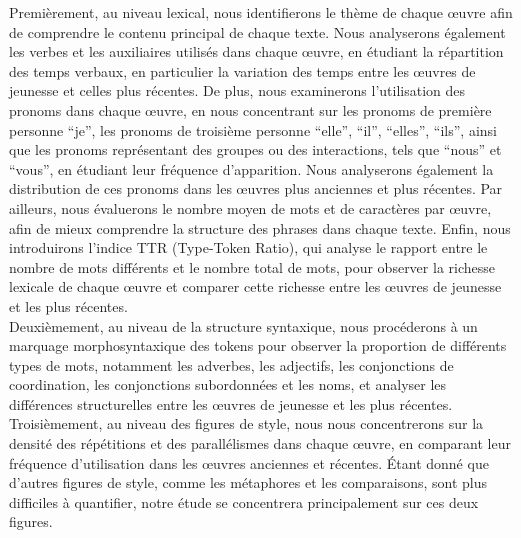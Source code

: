 Premièrement, au niveau lexical, nous identifierons le thème de chaque œuvre afin de comprendre le contenu principal de chaque texte. Nous analyserons également les verbes et les auxiliaires utilisés dans chaque œuvre, en étudiant la répartition des temps verbaux, en particulier la variation des temps entre les œuvres de jeunesse et celles plus récentes. De plus, nous examinerons l'utilisation des pronoms dans chaque œuvre, en nous concentrant sur les pronoms de première personne ``je'', les pronoms de troisième personne ``elle'', ``il'', ``elles'', ``ils'', ainsi que les pronoms représentant des groupes ou des interactions, tels que ``nous'' et ``vous'', en étudiant leur fréquence d'apparition. Nous analyserons également la distribution de ces pronoms dans les œuvres plus anciennes et plus récentes. Par ailleurs, nous évaluerons le nombre moyen de mots et de caractères par œuvre, afin de mieux comprendre la structure des phrases dans chaque texte. Enfin, nous introduirons l'indice TTR (Type-Token Ratio), qui analyse le rapport entre le nombre de mots différents et le nombre total de mots, pour observer la richesse lexicale de chaque œuvre et comparer cette richesse entre les œuvres de jeunesse et les plus récentes.\\

Deuxièmement, au niveau de la structure syntaxique, nous procéderons à un marquage morphosyntaxique des tokens pour observer la proportion de différents types de mots, notamment les adverbes, les adjectifs, les conjonctions de coordination, les conjonctions subordonnées et les noms, et analyser les différences structurelles entre les œuvres de jeunesse et les plus récentes.\\

Troisièmement, au niveau des figures de style, nous nous concentrerons sur la densité des répétitions et des parallélismes dans chaque œuvre, en comparant leur fréquence d'utilisation dans les œuvres anciennes et récentes. Étant donné que d'autres figures de style, comme les métaphores et les comparaisons, sont plus difficiles à quantifier, notre étude se concentrera principalement sur ces deux figures.\\

